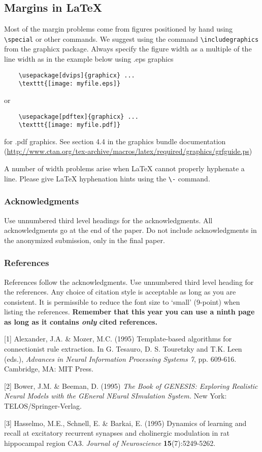 \documentclass{article} %
\begin{document}
	\subsection{Margins in LaTeX}
	
	Most of the margin problems come from figures positioned by hand using
	\verb+\special+ or other commands. We suggest using the command
	\verb+\includegraphics+
	from the graphicx package. Always specify the figure width as a multiple of
	the line width as in the example below using .eps graphics
	\begin{verbatim}
	\usepackage[dvips]{graphicx} ... 
	\texttt{[image: myfile.eps]} 
	\end{verbatim}
	or %
	\begin{verbatim}
	\usepackage[pdftex]{graphicx} ... 
	\texttt{[image: myfile.pdf]} 
	\end{verbatim}
	for .pdf graphics. 
	See section 4.4 in the graphics bundle documentation (\url{http://www.ctan.org/tex-archive/macros/latex/required/graphics/grfguide.ps}) 
	
	A number of width problems arise when LaTeX cannot properly hyphenate a
	line. Please give LaTeX hyphenation hints using the \verb+\-+ command.
	
	
	\subsubsection*{Acknowledgments}
	
	Use unnumbered third level headings for the acknowledgments. All
	acknowledgments go at the end of the paper. Do not include 
	acknowledgments in the anonymized submission, only in the 
	final paper. 
	
	\subsubsection*{References}
	
	References follow the acknowledgments. Use unnumbered third level heading for
	the references. Any choice of citation style is acceptable as long as you are
	consistent. It is permissible to reduce the font size to `small' (9-point) 
	when listing the references. {\bf Remember that this year you can use
		a ninth page as long as it contains \emph{only} cited references.}
	
	\small{
		[1] Alexander, J.A. \& Mozer, M.C. (1995) Template-based algorithms
		for connectionist rule extraction. In G. Tesauro, D. S. Touretzky
		and T.K. Leen (eds.), {\it Advances in Neural Information Processing
			Systems 7}, pp. 609-616. Cambridge, MA: MIT Press.
		
		[2] Bower, J.M. \& Beeman, D. (1995) {\it The Book of GENESIS: Exploring
			Realistic Neural Models with the GEneral NEural SImulation System.}
		New York: TELOS/Springer-Verlag.
		
		[3] Hasselmo, M.E., Schnell, E. \& Barkai, E. (1995) Dynamics of learning
		and recall at excitatory recurrent synapses and cholinergic modulation
		in rat hippocampal region CA3. {\it Journal of Neuroscience}
		{\bf 15}(7):5249-5262.
	}
	
\end{document}
